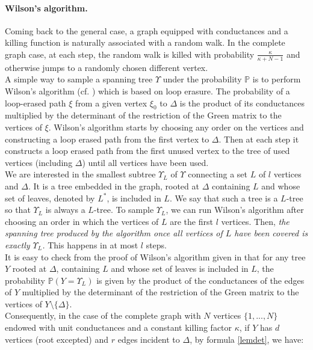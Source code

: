 \documentclass[11pt]{article}
\begin{document}
 \paragraph{Wilson's algorithm.} Coming back to the general case,  a graph equipped with conductances and a killing function is naturally associated with a random walk. In the complete graph case, at each step, the  random walk is killed with probability $\frac{\kappa}{\kappa+N-1}$ and otherwise jumps to a randomly chosen different vertex.\\  A simple way to sample a spanning tree $\Upsilon$ under the probability $\mathbb P$ is to perform Wilson's algorithm (cf. \cite{wil}) which is based on loop erasure. The probability of a loop-erased path $\xi$ from a given vertex $\xi_0$ to $\Delta$ is the product of its conductances multiplied by the determinant of the restriction of the Green matrix to the vertices of $\xi$. Wilson's algorithm starts by choosing any order on the vertices and constructing a loop erased path from the first vertex to $\Delta$. Then at each step it constructs a loop erased path from the first unused vertex to the tree of used vertices (including $\Delta$) until all vertices have been used.\\We are interested in the smallest subtree $\Upsilon_L$ of $\Upsilon$ connecting a set $L$ of $l$ vertices and $\Delta$. It is a tree embedded in the graph, rooted at $\Delta$ containing $L$ and whose set of leaves, denoted by $L^*$, is included in $L$. We say that such a tree  is a $ L$-tree so that  $\Upsilon_L$ is always a $ L$-tree.  To sample $\Upsilon_L$, we can run Wilson's algorithm after choosing an order in which the vertices of $L$ are the first $l$ vertices. Then, \emph{the spanning tree  produced by the algorithm once all vertices of $L$ have been covered is exactly $\Upsilon_L$.}  This happens in at most $l$ steps.\\
  
  It is easy to check from the proof of Wilson’s algorithm given in \cite{book} that for any tree $Y$ rooted at $\Delta$,  containing $L$ and whose set of leaves is included in $L$, the probability $\mathbb P(Y= \Upsilon_L)$ is given by the product of the conductances of the edges of $Y$ multiplied by the determinant of the restriction of the Green matrix to the vertices of $Y\setminus \{\Delta\}$.\\
Consequently, in the case of the complete graph with $N$ vertices $\{1,...,N\}$ endowed with unit conductances and a constant killing factor $\kappa$, if $Y$ has $d$ vertices (root excepted) and $r$ edges incident to $\Delta$, by formula \ref{lemdet}, we have: 
 
\end{document}

